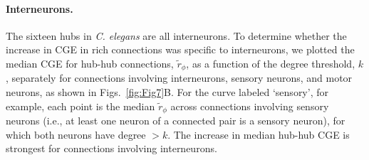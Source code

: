 \documentclass[10pt,letterpaper]{article}
\begin{document}
\paragraph{Interneurons.}
The sixteen hubs in \textit{C. elegans} are all interneurons.
To determine whether the increase in CGE in rich connections was specific to interneurons, we plotted the median CGE for hub-hub connections, $\tilde{r}_\phi$, as a function of the degree threshold, $k$, separately for connections involving interneurons, sensory neurons, and motor neurons, as shown in Figs.~\ref{fig:Fig7}B.
For the curve labeled `sensory', for example, each point is the median $\tilde{r}_\phi$ across connections involving sensory neurons (i.e., at least one neuron of a connected pair is a sensory neuron), for which both neurons have degree $>k$.
The increase in median hub-hub CGE is strongest for connections involving interneurons.
\end{document}
